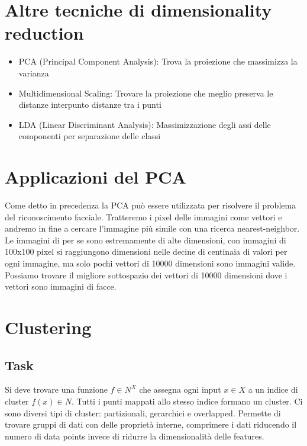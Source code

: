 		\section{Altre tecniche di dimensionality reduction}
		\begin{itemize}
			\item PCA (Principal Component Analysis): Trova la proiezione che massimizza la varianza
			\item Multidimensional Scaling: Trovare la proiezione che meglio preserva le distanze interpunto distanze tra i punti 
			\item LDA (Linear Discriminant Analysis): Massimizzazione degli assi delle componenti per separazione delle classi
		\end{itemize}
		
		\section{Applicazioni del PCA}
		Come detto in precedenza la PCA pu\`o essere utilizzata per risolvere il problema del riconoscimento facciale. 
		Tratteremo i pixel delle immagini come vettori e andremo in fine a cercare l'immagine pi\`u simile con una ricerca nearest-neighbor. 
		Le immagini di per se sono estremamente di alte dimensioni, con immagini di 100x100 pixel si raggiungono dimensioni nelle decine di centinaia di valori per ogni immagine, ma solo pochi vettori di 10000 dimensioni sono immagini valide. 
		Possiamo trovare il migliore sottospazio dei vettori di 10000 dimensioni dove i vettori sono immagini di facce.

\section{Clustering}
	\subsection{Task}
	Si deve trovare una funzione $f\in N^X$ che assegna ogni input $x\in X$ a un indice di cluster $f(x)\in N$.
	Tutti i punti mappati allo stesso indice formano un cluster.
	Ci sono diversi tipi di cluster: partizionali, gerarchici e overlapped.
	Permette di trovare gruppi di dati con delle propriet\`a interne, comprimere i dati riducendo il numero di data points invece di ridurre la dimensionalit\`a delle features.	
	
